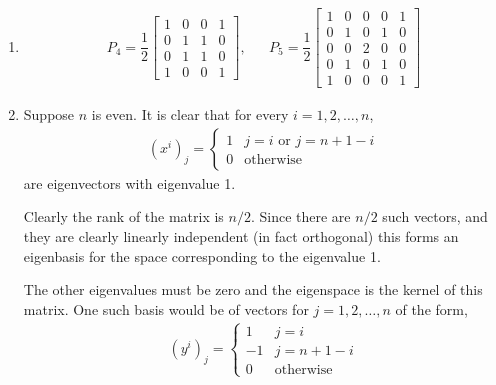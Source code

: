 \documentclass[10pt]{article}
\begin{document}
\begin{solution}[Solution]
\begin{enumerate}[label=(\alph*)]
    \item
    \begin{align*}
        P_4 = \dfrac{1}{2}\left[\begin{array}{cccc}
        1 & 0 & 0 & 1 \\
        0 & 1 & 1 & 0 \\
        0 & 1 & 1 & 0 \\
        1 & 0 & 0 & 1
        \end{array}\right]
        ,&&
        P_5 = \dfrac{1}{2}\left[\begin{array}{ccccc}
        1 & 0 &0 & 0 & 1 \\
        0 & 1 & 0 & 1 & 0 \\
        0 & 0 & 2 & 0 & 0 \\
        0 & 1 & 0 & 1 & 0 \\
        1 & 0 & 0 & 0 & 1
        \end{array}\right]
    \end{align*}
    \item
    Suppose \( n \) is even. It is clear that for every \( i = 1,2, \ldots, n \),
    \begin{align*}
        (x^i)_j = \begin{cases}
            1 & j = i \text{ or } j = n+1-i \\
            0 & \text{otherwise}
        \end{cases}
    \end{align*}
    are eigenvectors with eigenvalue 1.

    Clearly the rank of the matrix is \( n/2 \). Since there are \( n/2 \) such vectors, and they are clearly linearly independent (in fact orthogonal) this forms an eigenbasis for the space corresponding to the eigenvalue 1.

    The other eigenvalues must be zero and the eigenspace is the kernel of this matrix. One such basis would be of vectors for \( j = 1,2,\ldots, n \) of the form,
    \begin{align*}
        (y^i)_j = \begin{cases}
            1 & j = i \\
            -1 & j = n+1-i \\
            0 & \text{otherwise}
        \end{cases}
    \end{align*}


\end{enumerate}
\end{solution}
\end{document}
